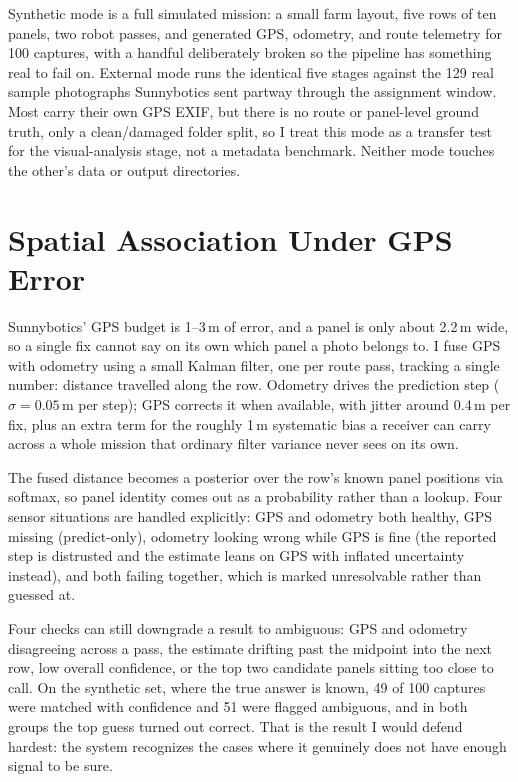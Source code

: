 \documentclass[10pt,conference]{IEEEtran}
\begin{document}
Synthetic mode is a full simulated mission: a small farm layout, five rows of ten panels, two robot passes, and generated GPS, odometry, and route telemetry for 100 captures, with a handful deliberately broken so the pipeline has something real to fail on. External mode runs the identical five stages against the 129 real sample photographs Sunnybotics sent partway through the assignment window. Most carry their own GPS EXIF, but there is no route or panel-level ground truth, only a clean/damaged folder split, so I treat this mode as a transfer test for the visual-analysis stage, not a metadata benchmark. Neither mode touches the other's data or output directories.

\section{Spatial Association Under GPS Error}
Sunnybotics' GPS budget is 1--3\,m of error, and a panel is only about 2.2\,m wide, so a single fix cannot say on its own which panel a photo belongs to. I fuse GPS with odometry using a small Kalman filter, one per route pass, tracking a single number: distance travelled along the row. Odometry drives the prediction step ($\sigma{=}0.05$\,m per step); GPS corrects it when available, with jitter around 0.4\,m per fix, plus an extra term for the roughly 1\,m systematic bias a receiver can carry across a whole mission that ordinary filter variance never sees on its own.

The fused distance becomes a posterior over the row's known panel positions via softmax, so panel identity comes out as a probability rather than a lookup. Four sensor situations are handled explicitly: GPS and odometry both healthy, GPS missing (predict-only), odometry looking wrong while GPS is fine (the reported step is distrusted and the estimate leans on GPS with inflated uncertainty instead), and both failing together, which is marked unresolvable rather than guessed at.

Four checks can still downgrade a result to ambiguous: GPS and odometry disagreeing across a pass, the estimate drifting past the midpoint into the next row, low overall confidence, or the top two candidate panels sitting too close to call. On the synthetic set, where the true answer is known, 49 of 100 captures were matched with confidence and 51 were flagged ambiguous, and in both groups the top guess turned out correct. That is the result I would defend hardest: the system recognizes the cases where it genuinely does not have enough signal to be sure.
\end{document}
